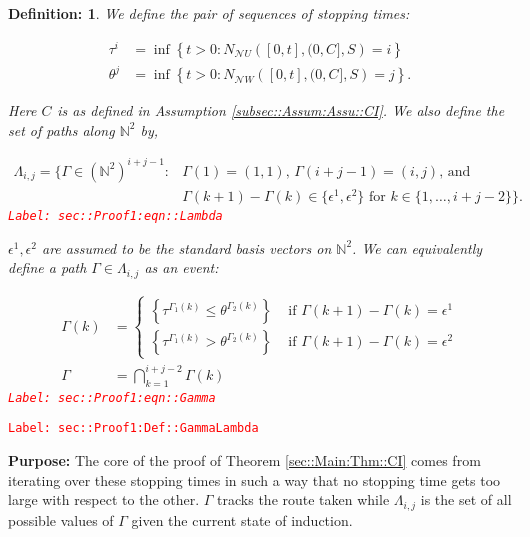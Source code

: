 \documentclass[12pt]{article}
\newcommand{\mb}{\mathbb}
\newcommand{\mc}{\mathcal}
\newcommand{\te}{\text}
\newcommand{\ep}{\epsilon}
\newcommand{\tr}{\textcolor{red}}
\newcommand{\labe}[1]{\tr{\texttt{Label: #1}}}
\newcommand{\purpose}{\textbf{Purpose: }}
\renewcommand{\U}{U}							%
\newcommand{\UU}{W}								%
\renewcommand{\S}{S}							%
\newcommand{\ev}[1]{\ep^{#1}}					%
\renewcommand{\t}{t}							%
\newcommand{\neigh}{\mc{N}}						%
\newcommand{\poiss}[1]{N_{#1}}						%
\newcommand{\rt}[1]{\tau^{#1}}						%
\newcommand{\rtt}[1]{\theta^{#1}}					%
\renewcommand{\it}{k}								%
\newcommand{\itt}{i}								%
\newcommand{\ittt}{j}								%
\newcommand{\const}[1]{C_{#1}}						%
\newcommand{\apath}{\Gamma}						%
\newcommand{\pathset}[2]{\Lambda_{#1,#2}}			%
\newtheorem{defn}[thms]{Definition: }
\begin{document}
\begin{defn}
We define the pair of sequences of stopping times:

\begin{align*}
\rt{\itt} &= \inf \left\{\t > 0: \poiss{\neigh{\U}}\left([0,\t],(0,\const{}],\S\right) = \itt\right\}\\
\rtt{\ittt} &= \inf \left\{\t > 0: \poiss{\neigh{\UU}}\left([0,\t],(0,\const{}],\S\right) = \ittt\right\}.
\end{align*}

Here \(\const{}\) is as defined in Assumption \ref{subsec::Assum:Assu::CI}. We also define the set of paths along \(\mb{N}^2\) by,

\begin{align}
\pathset{\itt}{\ittt} = \{\apath \in (\mb{N}^2)^{\itt+\ittt-1}: &\apath(1) = (1,1)\te{, } \apath(\itt+\ittt-1) = (\itt,\ittt)\te{, and } \nonumber\\
&\Gamma(\it+1) - \Gamma(\it)\in \{\ev{1},\ev{2}\}\te{ for }\it\in \{1,\dots, \itt+\ittt-2\}\}.
\label{sec::Proof1:eqn::Lambda}
\end{align}
\labe{sec::Proof1:eqn::Lambda}

\(\ev{1},\ev{2}\) are assumed to be the standard basis vectors on \(\mb{N}^2\). We can equivalently define a path \(\apath \in \pathset{\itt}{\ittt}\) as an event:

\begin{align}
\apath(\it) &= \begin{cases}
\left\{\rt{\apath_1(\it)} \leq \rtt{\apath_2(\it)}\right\} &\te{ if } \apath(\it+1) - \apath(\it) = \ev{1}\\
\left\{\rt{\apath_1(\it)} > \rtt{\apath_2(\it)}\right\} &\te{ if } \apath(\it+1) - \apath(\it) = \ev{2}
\end{cases}\\
\apath &= \bigcap_{\it=1}^{\itt+\ittt-2} \apath(\it)
\label{sec::Proof1:eqn::Gamma}
\end{align}
\labe{sec::Proof1:eqn::Gamma}
\label{sec::Proof1:Def::GammaLambda}
\end{defn}
\labe{sec::Proof1:Def::GammaLambda}

\purpose The core of the proof of Theorem \ref{sec::Main:Thm::CI} comes from iterating over these stopping times in such a way that no stopping time gets too large with respect to the other. \(\apath\) tracks the route taken while \(\pathset{\itt}{\ittt}\) is the set of all possible values of \(\apath\) given the current state of induction.
\end{document}
